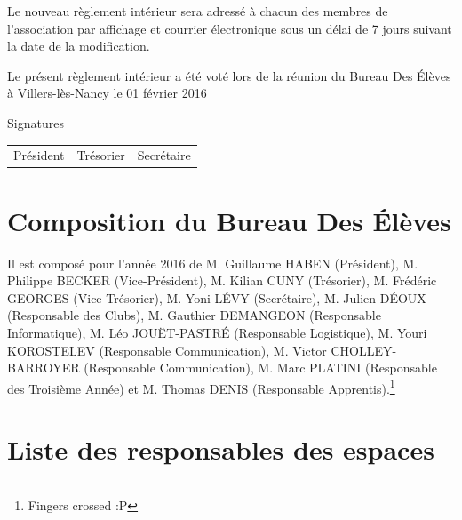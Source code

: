 \documentclass{article} %
\begin{document}
		Le nouveau règlement intérieur sera adressé à chacun des membres de
		l'association par affichage et courrier électronique sous un délai de 7
		jours suivant la date de la modification.

\vfill
\begin{center}
	{\large\light Le présent règlement intérieur a été voté lors de la réunion
	du Bureau Des Élèves à Villers-lès-Nancy le 01 février 2016}
\end{center}
\vfill
Signatures\par
\vspace{0.5cm}
\begin{tabular*}{\textwidth}{@{\extracolsep{\fill}}ccc}
	Président & Trésorier & Secrétaire
\end{tabular*}
\vspace{3cm}
\clearpage

	\section*{Composition du Bureau Des Élèves}
		
		Il est composé pour l’année 2016 de M. Guillaume HABEN (Président), M.
		Philippe BECKER (Vice-Président), M. Kilian CUNY (Trésorier), M.
		Frédéric GEORGES (Vice-Trésorier), M. Yoni LÉVY (Secrétaire), M. Julien
		DÉOUX (Responsable des Clubs), M. Gauthier DEMANGEON (Responsable
		Informatique), M. Léo JOUËT-PASTRÉ (Responsable Logistique), M. Youri
		KOROSTELEV (Responsable Communication), M. Victor CHOLLEY-BARROYER
		(Responsable Communication), M. Marc PLATINI (Responsable des Troisième
		Année) et M. Thomas DENIS (Responsable Apprentis).\footnote{Fingers
		crossed :P}

	\section*{Liste des responsables des espaces}
\end{document}
